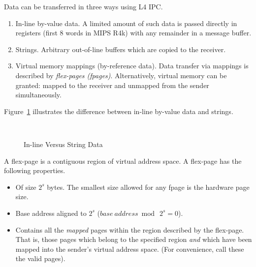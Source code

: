 
\label{sec:msgdata}

Data can be transferred in three ways using L4 IPC.

\begin{enumerate}

\item In-line by-value data. A limited amount of such data is passed
  directly in registers (first 8 words in MIPS R4k) with any remainder
  in a message buffer.

\item Strings. Arbitrary out-of-line buffers which are copied to the
  receiver.
        
\item Virtual memory mappings (by-reference data). Data transfer via
  mappings is described by \emph{flex-pages (fpages)}. Alternatively,
  virtual memory can be granted: mapped to the receiver and unmapped
  from the sender simultaneously.

\end{enumerate}

Figure~\ref{fig:msgdata} illustrates the difference between in-line
by-value data and strings.

\begin{figure}[htb]
\centering
\mbox{\quad
      }
\caption{In-line Versus String Data}
\label{fig:msgdata}
\end{figure}

A \label{s:fpages}flex-page is a contiguous region of virtual address
space. A flex-page has the following properties.

\begin{itemize}
        
\item Of size \(2^{s}\) bytes. The smallest size allowed for any fpage
  is the hardware page size.

\item Base address aligned to \(2^{s}\) (\(base~address \bmod~2^{s} =
  0 \)).

\item Contains all the \emph{mapped} pages within the region described
  by the flex-page. That is, those pages which belong to the specified
  region \emph{and} which have been mapped into the sender's virtual
  address space. (For convenience, call these the valid pages).

\end{itemize}

